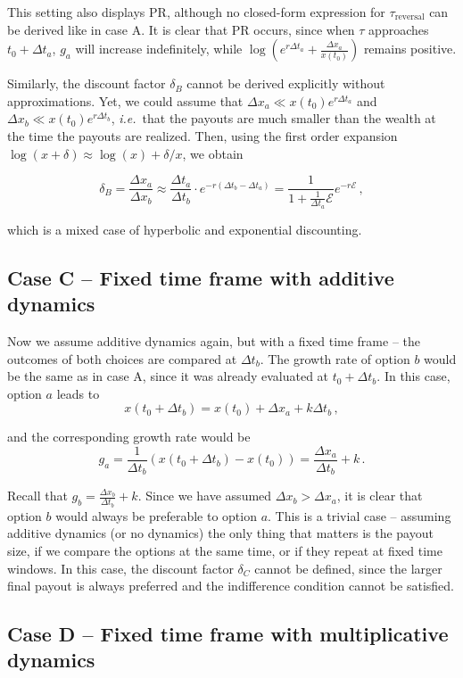 \documentclass[11pt]{article}
\newcommand{\ie}{{\it i.e.}\ }
\newcommand{\be}{\begin{equation}}
\newcommand{\ee}{\end{equation}}
\newcommand{\Dt}{\Delta t}
\newcommand{\Dx}{\Delta x}
\newcommand{\Epsilon}{\mathcal{E}}
\numberwithin{equation}{section}
\begin{document}
This setting also displays PR, although no closed-form expression for $\tau_{\text{reversal}}$ can be derived like in case A. It is clear that PR occurs, since when $\tau$ approaches $t_0+\Dt_a$, $g_a$ will increase indefinitely, while $\log{\left(e^{r \Dt_a} + \frac{\Dx_a}{x\left(t_0\right)}\right)}$ remains positive.

Similarly, the discount factor $\delta_B$ cannot be derived explicitly without approximations. Yet, we could assume that $\Dx_a \ll x\left(t_0\right)e^{r \Dt_a}$ and $\Dx_b \ll x\left(t_0\right)e^{r \Dt_b}$, \ie that the payouts are much smaller than the wealth at the time the payouts are realized. Then, using the first order expansion $\log\left(x+\delta\right) \approx \log\left(x\right) + \delta/x$, we obtain

\be
\delta_B = \frac{\Dx_a}{\Dx_b} \approx \frac{\Dt_a}{\Dt_b} \cdot e^{-r \left(\Dt_b - \Dt_a\right)} = \frac{1}{1+\frac{1}{\Dt_a} \Epsilon}e^{-r\Epsilon}\,,
\ee

which is a mixed case of hyperbolic and exponential discounting.

\subsection{Case C -- Fixed time frame with additive dynamics}\label{sec:case_C}

Now we assume additive dynamics again, but with a fixed time frame -- the outcomes of both choices are compared at $\Dt_b$. The growth rate of option $b$ would be the same as in case A, since it was already evaluated at $t_0+\Dt_b$. In this case, option $a$ leads to
\be
x\left(t_0+\Dt_b\right) = x\left(t_0\right) + \Dx_a + k \Dt_b\,,
\ee

and the corresponding growth rate would be
\be
g_a = \frac{1}{\Dt_b}\left(x\left(t_0+\Dt_b\right) - x\left(t_0\right)\right) = \frac{\Dx_a}{\Dt_b} + k\,.
\ee

Recall that $g_b = \frac{\Dx_b}{\Dt_b} + k$. Since we have assumed $\Dx_b > \Dx_a$, it is clear that option $b$ would always be preferable to option $a$. This is a trivial case -- assuming additive dynamics (or no dynamics) the only thing that matters is the payout size, if we compare the options at the same time, or if they repeat at fixed time windows. In this case, the discount factor $\delta_C$ cannot be defined, since the larger final payout is always preferred and the indifference condition cannot be satisfied.

\subsection{Case D -- Fixed time frame with multiplicative dynamics}\label{sec:case_D}
\end{document}
